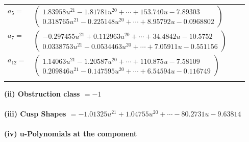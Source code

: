 \documentclass[1p]{elsarticle_modified}
\theoremstyle{definition}
\begin{document}
\begin{tabular}{m{7pt} m{180pt} m{7pt} m{180pt} }
\flushright $a_{5}=$&$\begin{pmatrix}1.83958 u^{21}-1.81781 u^{20}+\cdots+153.740 u-7.89303\\0.318765 u^{21}-0.225148 u^{20}+\cdots+8.95792 u-0.0968802\end{pmatrix}$ \\
\flushright $a_{7}=$&$\begin{pmatrix}-0.297455 u^{21}+0.112963 u^{20}+\cdots+34.4842 u-10.5752\\0.0338753 u^{21}-0.0534463 u^{20}+\cdots+7.05911 u-0.551156\end{pmatrix}$ \\
\flushright $a_{12}=$&$\begin{pmatrix}1.14063 u^{21}-1.20587 u^{20}+\cdots+110.875 u-7.58109\\0.209846 u^{21}-0.147595 u^{20}+\cdots+6.54594 u-0.116749\end{pmatrix}$\\&\end{tabular}
\flushleft \textbf{(ii) Obstruction class $= -1$}\\~\\
\flushleft \textbf{(iii) Cusp Shapes $= -1.01325 u^{21}+1.04755 u^{20}+\cdots-80.2731 u-9.63814$}\\~\\
\newpage\renewcommand{\arraystretch}{1}
\flushleft \textbf{(iv) u-Polynomials at the component}\newline \\
\end{document}
